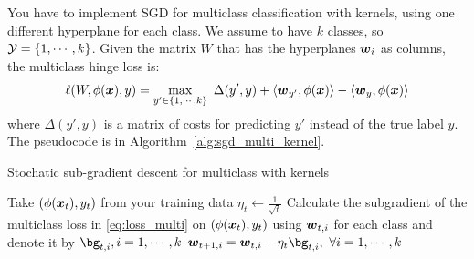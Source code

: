 \documentclass{article}
\begin{document}
You have to implement SGD for multiclass classification with kernels, using one different hyperplane for each class. 
We assume to have $k$ classes, so $\mathcal{Y}=\{1, \cdots,k\}$. Given the matrix $W$ that has the hyperplanes $\boldsymbol{w}_i$ as columns, the multiclass hinge loss is:
\begin{equation}
\label{eq:loss_multi}
\ell(W,\phi(\boldsymbol{x}),y)=\max_{y' \in \{1, \cdots, k\}} \ \Delta(y', y) + \langle \boldsymbol{w}_{y'}, \phi(\boldsymbol{x})\rangle  - \langle\boldsymbol{w}_y, \phi(\boldsymbol{x}) \rangle
\end{equation}
where $\Delta(y', y)$ is a matrix of costs for predicting $y'$ instead of the true label $y$. 
The pseudocode is in Algorithm~\ref{alg:sgd_multi_kernel}.

\begin{algorithm}[h]
\caption{Stochatic sub-gradient descent for multiclass with kernels}\label{alg:sgd_multi_kernel}
\begin{algorithmic}
    \STATE Take $(\phi(\boldsymbol{x}_t),y_t)$ from your training data
    \STATE $\eta_t \leftarrow \frac{1}{\sqrt{t}}$
    \STATE Calculate the subgradient of the multiclass loss in \eqref{eq:loss_multi} on $(\phi(\boldsymbol{x}_t),y_t)$ using $\boldsymbol{w}_{t,i}$ for each class and denote it by $\bg_{t,i}, i=1, \cdots,k$
    \STATE $\bw_{t+1,i} = \bw_{t,i} -\eta_t \bg_{t,i}, \ \forall i=1,\cdots,k$
    \ENDFOR
\end{algorithmic}
\end{algorithm}
\end{document}
